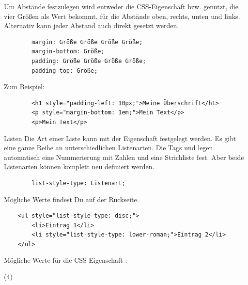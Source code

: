\documentclass[lerntheke,12pt,a5paper,landscape]{arbeitsblatt}
\begin{document}
\begin{loesungskarte}[Abstände]
	Um Abstände festzulegen wird entweder die CSS-Eigenschaft  bzw.  genutzt, die vier Größen als Wert bekommt, für die Abstände oben, rechts, unten und links. Alternativ kann jeder Abstand auch direkt gesetzt werden.
	\begin{verbatim}
		margin: Größe Größe Größe Größe;
		margin-bottom: Größe;
		padding: Größe Größe Größe Größe;
		padding-top: Größe;
	\end{verbatim}

	Zum Beispiel:
	\begin{verbatim}
		<h1 style="padding-left: 10px;">Meine Überschrift</h1>
		<p style="margin-bottom: 1em;">Mein Text</p>
		<p>Mein Text</p>
	\end{verbatim}
\end{loesungskarte}

\begin{karte1}{Listen}
	Die Art einer Liste kann mit der Eigenschaft  festgelegt werden. Es gibt eine ganze Reihe an unterschiedlichen Listenarten. Die Tags  und  legen automatisch eine Nummerierung mit Zahlen und eine Strichliste fest. Aber beide Listenarten können komplett neu definiert werden.
	\begin{verbatim}
		list-style-type: Listenart;
	\end{verbatim}

	Mögliche Werte findest Du auf der Rückseite.

	\begin{verbatim}
	<ul style="list-style-type: disc;">
		<li>Eintrag 1</li>
		<li style="list-style-type: lower-roman;">Eintrag 2</li>
	</ul>
	\end{verbatim}
\end{karte1}

\begin{loesungskarte}[Listen]
	Mögliche Werte für die CSS-Eigenschaft :

	\begin{tasks}[label=](4)
		\task {}
		\task {}
		\task {}
		\task {}
		\task {}
		\task {}
		\task {}
		\task {}
		\task {}
		\task {}
		\task {}
		\task {}
		\task {}
		\task {}
		\task {}
		\task {}
		\task {}
		\task {}
		\task {}
		\task {}
		\task {}
	\end{tasks}
\end{loesungskarte}
\end{document}

